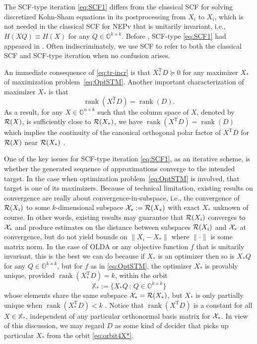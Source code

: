 \documentclass[11pt]{article}
\def\bbO{\mathbb{O}}
\def\bbX{\mathbb{X}}
\def\cR{{\cal R}}
\def\cX{{\cal X}}
\DeclareMathOperator{\rank}{rank}
\DeclareMathOperator{\T}{T}
\def\what{\widehat}
\theoremstyle{definition}
\numberwithin{equation}{section}
\numberwithin{figure}{section}
\numberwithin{table}{section}
\begin{document}
The SCF-type iteration \eqref{eq:SCF1} differs from
the classical SCF  for solving discretized
Kohn-Sham equations in its postprocessing from $\what X_i$ to $X_i$, which is not needed in the classical SCF for NEPv
that is unitarily invariant, i.e., $H(XQ)\equiv H(X)$ for any $Q\in\bbO^{k\times k}$. Before \cite{luli:2022},
SCF-type \eqref{eq:SCF1} had appeared in \cite{wazl:2022,zhys:2020,zhwb:2022}. Often indiscriminately, we use SCF to
refer to both the classical SCF and SCF-type iteration when no confusion arises.

An immediate consequence of \eqref{eq:tr-incr} is that $X_*^{\T}D\succeq 0$ for  any maximizer $X_*$
of maximization problem~\eqref{eq:OptSTM}. Another important characterization of maximizer $X_*$
is that \cite[Theorem 3.1]{luli:2022}
\begin{equation}\label{cond:rank}
\rank(X_*^{\T}D)=\rank(D).
\end{equation}
As a result, for any $X\in\bbO^{n\times k}$ such that the column space of $X$, denoted by  $\cR(X)$, is sufficiently close to $\cR(X_*)$, we have
$\rank(X^{\T}D)=\rank(D)$ \cite[Lemma 5.1]{luli:2022} which implies the continuity
of the canonical orthogonal polar factor
of $X^{\T}D$ for $\cR(X)$ near $\cR(X_*)$ \cite{high:2008,li:1993b}.

One of the key issues for SCF-type iteration \eqref{eq:SCF1}, as an iterative scheme, is whether
the generated sequence of approximations converge to the intended target. In the case when
optimization problem~\eqref{eq:OptSTM} is involved, that target is one of its maximizers. Because of technical
limitation, existing results on convergence are really about convergence-in-subspace, i.e., the convergence of
$\cR(X_i)$ to some $k$-dimensional subspace $\cX_*:=\cR(X_*)$ with exact $X_*$ unknown of course.
In other words, existing results may guarantee that $\cR(X_i)$ converges to
$\cX_*$ and produce estimates on the distance between subspaces $\cR(X_i)$ and
$\cX_*$ at convergence, but do not yield bounds on $\|X_i-X_*\|$ where $\|\cdot\|$ is some matrix norm.
In the case of OLDA or any objective function $f$ that is
unitarily invariant, this is the best  we can do because if $X_*$ is an optimizer then so is $X_*Q$ for any
$Q\in\bbO^{k\times k}$, but for $f$ as in \eqref{eq:OptSTM}, the optimizer $X_*$
is provably unique, provided $\rank(X_*^{\T}D)=k$,  within the orbit
\begin{equation}\label{eq:orbit4X*}
\bbX_*:=\{X_*Q\,:\, Q\in\bbO^{k\times k}\}
\end{equation}
whose elements share the same subspace $\cX_*=\cR(X_*)$, but $X_*$ is only
partially unique when $\rank(X_*^{\T}D)<k$ \cite{wazl:2022,luli:2022}. Notice that
$\rank(X^{\T}D)$ is a constant for all $X\in\bbX_*$, independent of any particular orthonormal basis matrix for $\cX_*$.
In view of this discussion, we may regard $D$ as some kind of decider that picks up particular $X_*$ from the orbit
\eqref{eq:orbit4X*}.
\end{document}
